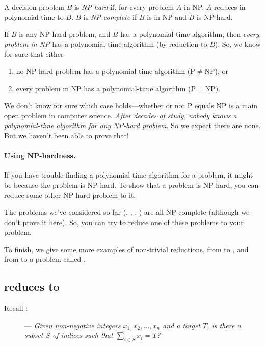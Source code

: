 \documentclass[11pt]{article}
\begin{document}
\begin{definition}
  A decision problem $B$ is \emph{NP-hard} if, for every problem $A$ in NP,
  $A$ reduces in polynomial time to $B$.
  $B$ is \emph{NP-complete} if $B$ is in NP and $B$ is NP-hard.
\end{definition}

If $B$ is any NP-hard problem, and $B$ has a polynomial-time algorithm,
then \emph{every problem in NP} has a polynomial-time algorithm
(by reduction to $B$).
So, we know for sure that either
\begin{enumerate}
\item no NP-hard problem has
  a polynomial-time algorithm (P${} \ne {}$NP), or
\item every problem in NP has a polynomial-time algorithm (P${} = {}$NP).
\end{enumerate}
We don't know for sure which case holds---whether or not P equals NP is a main open problem in computer science.
\emph{After decades of study, nobody knows a polynomial-time algorithm
  for any NP-hard problem.}
So we expect there are none.
But we haven't been able to prove that!

\paragraph{Using NP-hardness.}

If you have trouble finding a polynomial-time algorithm for a problem,
it might be because the problem is NP-hard.  To show that a problem
is NP-hard, you can reduce some other NP-hard problem to it.

The problems we've considered so far
(, , ,
) 
are all NP-complete
(although we don't prove it here).
So, you can try to reduce one of these problems to your problem.

To finish, we give some more examples of non-trivial reductions,
from  to ,
and from  to a problem called .

\subsection{ reduces to }
Recall :

\begin{description}
\item[]---\em
  Given non-negative integers $x_1, x_2, \ldots, x_n$ and a target $T$,
  is there a subset $S$ of indices such that $\sum_{i\in S} x_i = T$?
\end{description}
\end{document}
